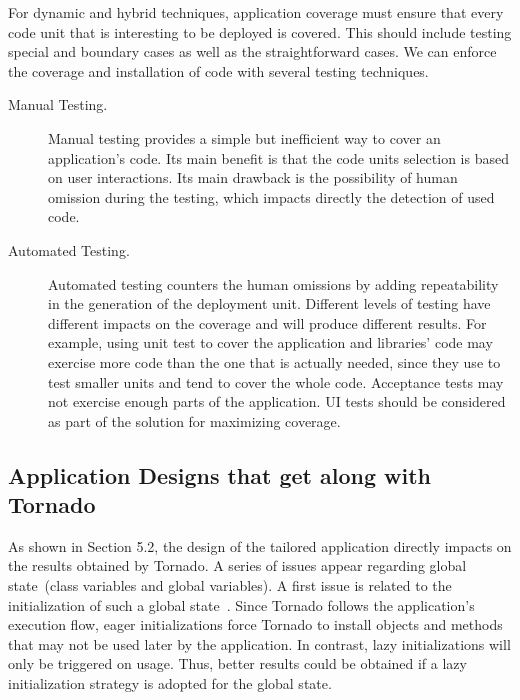 
For dynamic and hybrid techniques, application coverage must ensure that every code unit that is interesting to be deployed is covered. This should include testing special and boundary cases as well as the straightforward cases. We can enforce the coverage and installation of code with several testing techniques.

\begin{description}
\item[Manual Testing.] Manual testing provides a simple but inefficient way to cover an application's code. Its main benefit is that the code units selection is based on user interactions. Its main drawback is the possibility of human omission during the testing, which impacts directly the detection of used code. 
\item[Automated Testing.] Automated testing counters the human omissions by adding repeatability in the generation of the deployment unit. Different levels of testing have different impacts on the coverage and will produce different results. For example, using unit test to cover the application and libraries' code may exercise more code than the one that is actually needed, since they use to test smaller units and tend to cover the whole code. Acceptance tests may not exercise enough parts of the application. UI tests should be considered as part of the solution for maximizing coverage.
\end{description}


\subsection{Application Designs that get along with Tornado} As shown in Section 5.2, the design of the tailored application directly impacts on the results obtained by Tornado. A series of issues appear regarding global state~(\eg class variables and global variables). A first issue is related to the initialization of such a global state~\cite{Unga95a}. Since Tornado follows the application's execution flow, eager initializations force Tornado to install objects and methods that may not be used later by the application. In contrast, lazy initializations will only be triggered on usage. Thus, better results could be obtained if a lazy initialization strategy is adopted for the global state.

